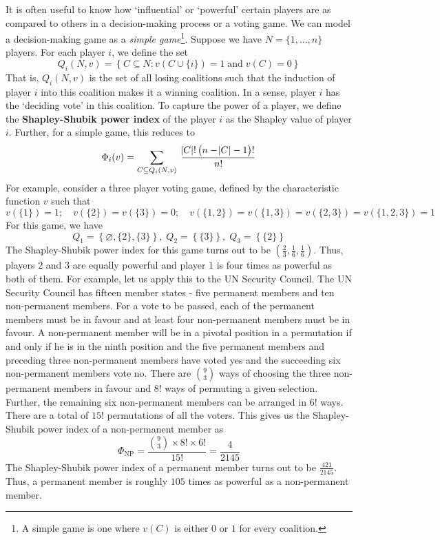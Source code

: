\documentclass{article}
\theoremstyle{definition}
\begin{document}
It is often useful to know how `influential' or `powerful' certain players are as compared to others in a decision-making process or a voting game. We can model a decision-making game as a \textit{simple game}\footnote{A simple game is one where $v(C)$ is either $0$ or $1$ for every coalition.}. Suppose we have $N = \{ 1, \ldots , n \}$ players. For each player $i$, we define the set
\[
    Q_i(N,v) = \left\{ C \subseteq N \colon v\left( C \cup \{i\} \right) =1 \; \text{and} \; v(C) = 0 \right\}
\]
That is, $Q_i(N,v)$ is the set of all losing coalitions such that the induction of player $i$ into this coalition makes it a winning coalition. In a sense, player $i$ has the `deciding vote' in this coalition. To capture the power of a player, we define the \textbf{Shapley-Shubik power index} of the player $i$ as the Shapley value of player $i$. Further, for a simple game, this reduces to
\[
    \Phi_i(v) = \sum\limits_{C \subseteq Q_i(N,v)} \; \frac{\abs{C}! \left( n - \abs{C} - 1 \right)!}{n!}
\]
For example, consider a three player voting game, defined by the characteristic function $v$ such that
\[
    v\left( \{1\} \right) = 1; \quad  v\left( \{2\} \right) =  v\left( \{3\} \right) = 0; \quad  v\left( \{1, 2\} \right) = v\left( \{1, 3\} \right) = v\left( \{2, 3\} \right) = v\left( \{1, 2, 3\} \right) = 1
\]
For this game, we have
\[
    Q_1 = \left\{ \varnothing , \{2\} , \{3\} \right\} , \; Q_2 = \left\{ \{3\} \right\}, \; Q_3 = \left\{ \{2\} \right\}
\]
The Shapley-Shubik power index for this game turns out to be $\left( \frac{2}{3} , \frac{1}{6} , \frac{1}{6} \right)$. Thus, players $2$ and $3$ are equally powerful and player $1$ is four times as powerful as both of them. For example, let us apply this to the UN Security Council. The UN Security Council has fifteen member states - five permanent members and ten non-permanent members. For a vote to be passed, each of the permanent members must be in favour and at least four non-permanent members must be in favour. A non-permanent member will be in a pivotal position in a permutation if and only if he is in the ninth position and the five permanent members and preceding three non-permanent members have voted yes and the succeeding six non-permanent members vote no. There are $\binom{9}{3}$ ways of choosing the three non-permanent members in favour and $8!$ ways of permuting a given selection. Further, the remaining six non-permanent members can be arranged in $6!$ ways. There are a total of $15!$ permutations of all the voters. This gives us the Shapley-Shubik power index of a non-permanent member as
\[
    \Phi_{\text{NP}} = \frac{\binom{9}{3} \times 8! \times 6!}{15!} = \frac{4}{2145}
\]
The Shapley-Shubik power index of a permanent member turns out to be $\frac{421}{2145}$. Thus, a permanent member is roughly $105$ times as powerful as a non-permanent member.
\end{document}
